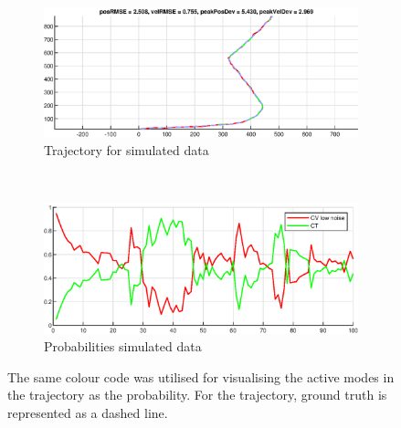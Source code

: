 \begin{figure}[ht]
    \centering
    \begin{subfigure}[h]{0.4\textwidth}
        \includegraphics[width=\textwidth]{figures/ga_1/2_estimated_trajectory}
        \caption{Trajectory for simulated data}
        \label{fig:ga_1_2_estimated_trajectory}
    \end{subfigure}%
    ~
    \begin{subfigure}[h]{0.4\textwidth}
        \includegraphics[width=\textwidth]{figures/ga_1/2_probs}
        \caption{Probabilities simulated data}
        \label{fig:ga_1_2_probabilities}
    \end{subfigure}
    \caption{The same colour code was utilised for visualising the active modes in the trajectory as the probability. For the trajectory, ground truth is represented as a dashed line. }
    \label{fig:ga_1_2_traj_and_probs} 
\end{figure}


